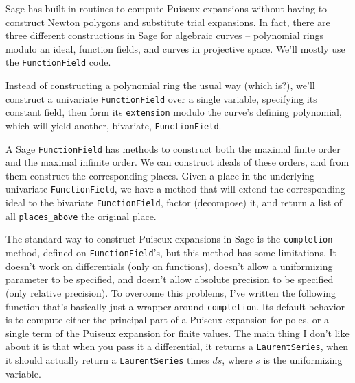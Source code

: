 \begin{comment}
# for f in test_curves:
#     analyze_multiple_points(f)
\end{sageblock}


$$y^3 - 3axy + x^3$$

This function contains an extra variable and is, in fact, a family of
algebraic curves.

\endexample

\end{comment}


\vfill\eject
{}

Sage has built-in routines to compute Puiseux expansions without having to
construct Newton polygons and substitute trial expansions.
In fact, there are three different
constructions in Sage for algebraic curves -- polynomial rings
modulo an ideal, function fields, and curves in projective space.
We'll mostly use the {\tt FunctionField} code.

Instead of constructing a polynomial ring the usual way (which is?), we'll
construct a univariate {\tt FunctionField} over a single variable, specifying its
constant field, then form its {\tt extension} modulo the curve's defining polynomial,
which will yield another, bivariate, {\tt FunctionField}.

A Sage {\tt FunctionField} has methods to construct both the maximal finite order
and the maximal infinite order.
We can construct ideals of these orders, and from them
construct the corresponding places.  Given a place in the underlying univariate
{\tt FunctionField}, we have a method that will extend the corresponding ideal
to the bivariate {\tt FunctionField}, factor (decompose) it, and return a list
of all {\tt places\_above} the original place.

The standard way to construct Puiseux expansions in Sage is the {\tt completion} method,
defined on {\tt FunctionField}'s,
but this method has some limitations.  It doesn't work on
differentials (only on functions), doesn't allow a uniformizing parameter to be
specified, and doesn't allow absolute precision to be specified (only relative precision).
To overcome this problems, I've written the following function that's basically just
a wrapper around {\tt completion}.  Its default behavior is to compute either
the principal part of a Puiseux expansion for poles, or a single term of the Puiseux
expansion for finite values.
The main thing I don't like about it is that
when you pass it a differential, it returns a {\tt LaurentSeries}, when it should actually
return a {\tt LaurentSeries} times $ds$, where $s$ is the uniformizing variable.


